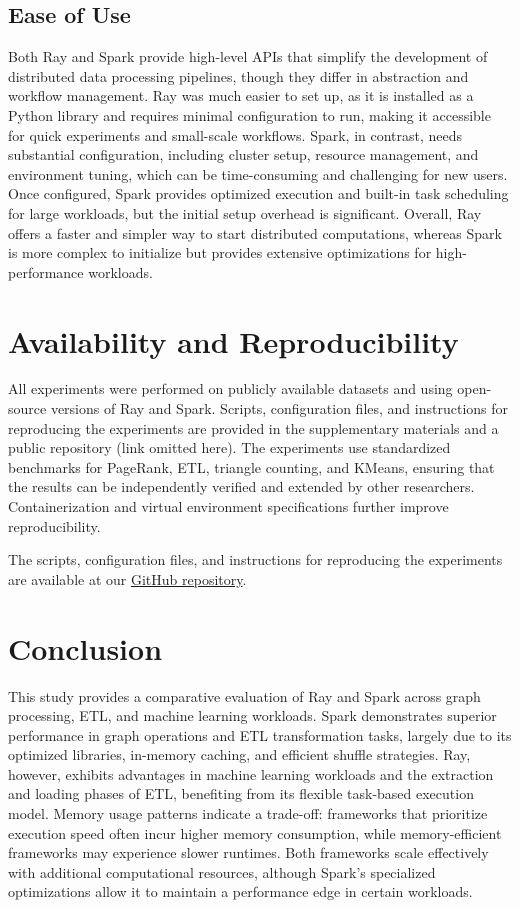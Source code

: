 \documentclass[conference]{IEEEtran}
\begin{document}
\subsection{Ease of Use}
Both Ray and Spark provide high-level
APIs that simplify the development of
distributed data processing pipelines, though they
differ in abstraction and workflow management.
Ray was much easier to set up,
as it is installed as a Python
library and requires minimal configuration to
run, making it accessible for quick experiments
and small-scale workflows. Spark, in contrast,
needs substantial configuration, including cluster setup,
resource management, and environment tuning, which can
be time-consuming and challenging for new users.
Once configured, Spark provides optimized execution
and built-in task scheduling for large workloads,
but the initial setup overhead is significant.
Overall, Ray offers a faster and simpler
way to start distributed computations, whereas
Spark is more complex to initialize but
provides extensive optimizations for high-performance workloads.

\section{Availability and Reproducibility}
All experiments were performed on publicly available datasets and using
open-source versions of Ray and Spark. Scripts, configuration files, and
instructions for reproducing the experiments are provided in the supplementary
materials and a public repository (link omitted here). The experiments use
standardized benchmarks for PageRank, ETL, triangle counting, and KMeans,
ensuring that the results can be independently verified and extended by other
researchers. Containerization and virtual environment specifications further
improve reproducibility.

The scripts, configuration files, and instructions for reproducing the experiments are available at our 
\href{https://github.com/liuminex/Big-Data-HDFS-Ray-vs-Spark}{GitHub repository}.



\section{Conclusion}
This study provides a comparative evaluation of Ray and Spark
across graph processing, ETL, and machine learning workloads.
Spark demonstrates superior performance in graph operations and
ETL transformation tasks, largely due to its optimized libraries,
in-memory caching, and efficient shuffle strategies. Ray, however,
exhibits advantages in machine learning workloads and the extraction
and loading phases of ETL, benefiting from its flexible task-based
execution model. Memory usage patterns indicate a trade-off:
frameworks that prioritize execution speed often incur higher
memory consumption, while memory-efficient frameworks may experience
slower runtimes. Both frameworks scale effectively with additional
computational resources, although Spark’s specialized optimizations
allow it to maintain a performance edge in certain workloads.
\end{document}
